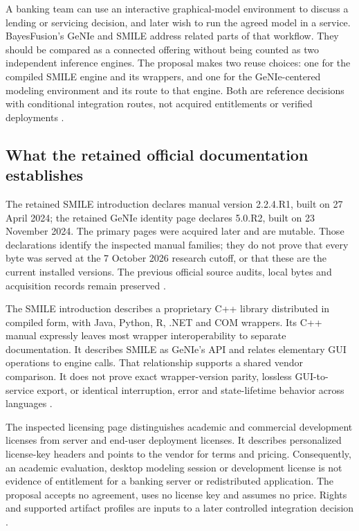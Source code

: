 A banking team can use an interactive graphical-model environment to discuss
a lending or servicing decision, and later wish to run the agreed model in
a service. BayesFusion's GeNIe and SMILE address related parts of that
workflow. They should be compared as a connected offering without being
counted as two independent inference engines. The proposal makes two reuse
choices: one for the compiled SMILE engine and its wrappers, and one for the
GeNIe-centered modeling environment and its route to that engine. Both are
reference decisions with conditional integration routes, not acquired
entitlements or verified deployments \citep{exec13_smile_intro,
exec13_smile_license,exec24_smile_choice}.

\subsection{What the retained official documentation establishes}
The retained SMILE introduction declares manual version 2.2.4.R1, built on
27 April 2024; the retained GeNIe identity page declares 5.0.R2, built on
23 November 2024. The primary pages were acquired later and are mutable.
Those declarations identify the inspected manual families; they do not
prove that every byte was served at the 7 October 2026 research cutoff,
or that these are the current installed versions. The previous official
source audits, local bytes and acquisition records remain preserved
\citep{exec13_smile_intro,exec13_genie_readme,exec24_smile_choice}.

The SMILE introduction describes a proprietary C++ library distributed in
compiled form, with Java, Python, R, .NET and COM wrappers. Its C++ manual
expressly leaves most wrapper interoperability to separate documentation.
It describes SMILE as GeNIe's API and relates elementary GUI operations to
engine calls. That relationship supports a shared vendor comparison. It
does not prove exact wrapper-version parity, lossless GUI-to-service export,
or identical interruption, error and state-lifetime behavior across languages
\citep{exec13_smile_intro}.

The inspected licensing page distinguishes academic and commercial
development licenses from server and end-user deployment licenses. It
describes personalized license-key headers and points to the vendor for
terms and pricing. Consequently, an academic evaluation, desktop modeling
session or development license is not evidence of entitlement for a banking
server or redistributed application. The proposal accepts no agreement,
uses no license key and assumes no price. Rights and supported artifact
profiles are inputs to a later controlled integration decision
\citep{exec13_smile_license,exec24_smile_choice}.

